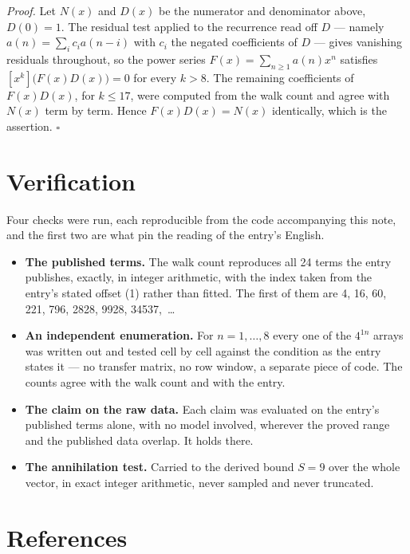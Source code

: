 \documentclass[11pt]{article}
\theoremstyle{definition}
\begin{document}
{\itshape Proof.} Let $N(x)$ and $D(x)$ be the numerator and denominator above, $D(0)=1$. The residual test applied to the recurrence read off $D$ --- namely $a(n) = \sum_i c_i a(n-i)$ with $c_i$ the negated coefficients of $D$ --- gives vanishing residuals throughout, so the power series $F(x)=\sum_{n\ge 1}a(n)x^n$ satisfies $[x^k]\bigl(F(x)D(x)\bigr) = 0$ for every $k > 8$. The remaining coefficients of $F(x)D(x)$, for $k \le 17$, were computed from the walk count and agree with $N(x)$ term by term. Hence $F(x)D(x) = N(x)$ identically, which is the assertion. $\square$

\section{Verification}

Four checks were run, each reproducible from the code accompanying this note, and the first two are what pin the reading of the entry's English.

\begin{itemize}

\item {\bfseries The published terms.} The walk count reproduces all 24 terms the entry publishes, exactly, in integer arithmetic, with the index taken from the entry's stated offset (1) rather than fitted. The first of them are 4, 16, 60, 221, 796, 2828, 9928, 34537,~\dots

\item {\bfseries An independent enumeration.} For $n = 1,\dots,8$ every one of the $4^{1n}$ arrays was written out and tested cell by cell against the condition as the entry states it --- no transfer matrix, no row window, a separate piece of code. The counts agree with the walk count and with the entry.

\item {\bfseries The claim on the raw data.} Each claim was evaluated on the entry's published terms alone, with no model involved, wherever the proved range and the published data overlap. It holds there.

\item {\bfseries The annihilation test.} Carried to the derived bound $S = 9$ over the whole vector, in exact integer arithmetic, never sampled and never truncated.

\end{itemize}

\section{References}
\end{document}
